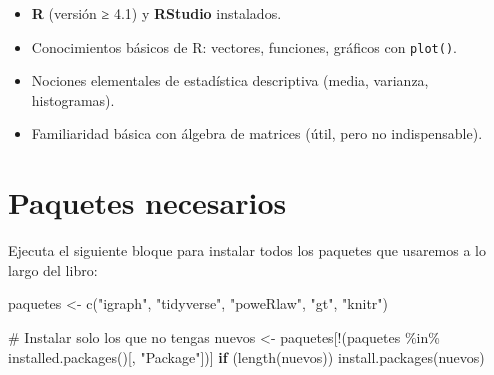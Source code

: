 \documentclass[
  letterpaper,
  DIV=11,
  numbers=noendperiod]{scrreprt}
\newenvironment{Shaded}{\begin{snugshade}}{\end{snugshade}}
\newcommand{\CommentTok}[1]{\textcolor[rgb]{0.37,0.37,0.37}{#1}}
\newcommand{\ControlFlowTok}[1]{\textcolor[rgb]{0.00,0.23,0.31}{\textbf{#1}}}
\newcommand{\FunctionTok}[1]{\textcolor[rgb]{0.28,0.35,0.67}{#1}}
\newcommand{\NormalTok}[1]{\textcolor[rgb]{0.00,0.23,0.31}{#1}}
\newcommand{\OtherTok}[1]{\textcolor[rgb]{0.00,0.23,0.31}{#1}}
\newcommand{\SpecialCharTok}[1]{\textcolor[rgb]{0.37,0.37,0.37}{#1}}
\newcommand{\StringTok}[1]{\textcolor[rgb]{0.13,0.47,0.30}{#1}}
\providecommand{\tightlist}{%
  \setlength{\itemsep}{0pt}\setlength{\parskip}{0pt}}
\begin{document}
\begin{tcolorbox}[enhanced jigsaw, toprule=.15mm, colframe=quarto-callout-important-color-frame, coltitle=black, titlerule=0mm, colback=white, breakable, leftrule=.75mm, arc=.35mm, bottomtitle=1mm, toptitle=1mm, rightrule=.15mm, bottomrule=.15mm, left=2mm, title=\textcolor{quarto-callout-important-color}{\faExclamation}\hspace{0.5em}{🔑 Antes de empezar necesitas}, colbacktitle=quarto-callout-important-color!10!white, opacityback=0, opacitybacktitle=0.6]

\begin{itemize}
\tightlist
\item
  \textbf{R} (versión ≥ 4.1) y \textbf{RStudio} instalados.
\item
  Conocimientos básicos de R: vectores, funciones, gráficos con
  \texttt{plot()}.
\item
  Nociones elementales de estadística descriptiva (media, varianza,
  histogramas).
\item
  Familiaridad básica con álgebra de matrices (útil, pero no
  indispensable).
\end{itemize}

\end{tcolorbox}

\section*{Paquetes necesarios}\label{paquetes-necesarios}


Ejecuta el siguiente bloque para instalar todos los paquetes que
usaremos a lo largo del libro:

\begin{Shaded}
\begin{Highlighting}[]
\NormalTok{paquetes }\OtherTok{\textless{}{-}} \FunctionTok{c}\NormalTok{(}\StringTok{"igraph"}\NormalTok{, }\StringTok{"tidyverse"}\NormalTok{, }\StringTok{"poweRlaw"}\NormalTok{, }\StringTok{"gt"}\NormalTok{, }\StringTok{"knitr"}\NormalTok{)}

\CommentTok{\# Instalar solo los que no tengas}
\NormalTok{nuevos }\OtherTok{\textless{}{-}}\NormalTok{ paquetes[}\SpecialCharTok{!}\NormalTok{(paquetes }\SpecialCharTok{\%in\%} \FunctionTok{installed.packages}\NormalTok{()[, }\StringTok{"Package"}\NormalTok{])]}
\ControlFlowTok{if}\NormalTok{ (}\FunctionTok{length}\NormalTok{(nuevos)) }\FunctionTok{install.packages}\NormalTok{(nuevos)}
\end{Highlighting}
\end{Shaded}
\end{document}
